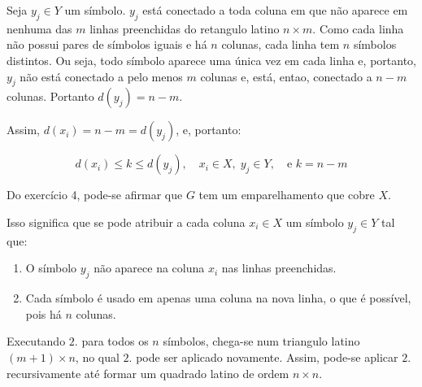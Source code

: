\documentclass{article}
\begin{document}
Seja $y_j \in Y$ um símbolo. $y_j$ está conectado a toda coluna em que não aparece em nenhuma das $m$ linhas preenchidas do retangulo latino $n \times m$. Como cada linha não possui pares de símbolos iguais e há  $n$ colunas, cada linha tem $n$ símbolos distintos. Ou seja, todo símbolo aparece uma única vez em cada linha e, portanto, $y_j$ não está conectado a pelo menos  $m$ colunas e, está, entao, conectado a $n - m$ colunas. Portanto $d(y_j) = n - m$.

Assim, $d(x_i) = n - m = d(y_j)$, e, portanto:


$$
d(x_i) \leq k \leq d(y_j), \quad x_i \in X, \; y_j \in Y, \quad \text{e } k = n - m
$$

Do exercício 4, pode-se afirmar que $G$ tem um emparelhamento que cobre $X$.

Isso significa que se pode atribuir a cada coluna $x_i \in X$  um símbolo $y_j \in Y$ tal que:

\begin{enumerate}
	\item O símbolo $y_j$ não aparece na coluna $x_i$ nas linhas preenchidas.
	\item Cada símbolo é usado em apenas uma coluna na nova linha, o que é possível, pois há $n$ colunas.
\end{enumerate}

Executando $2.$ para todos os $n$ símbolos, chega-se num triangulo latino $(m+1) \times n$, no qual $2.$ pode ser aplicado novamente. Assim, pode-se aplicar $2.$ recursivamente até formar um quadrado latino de ordem $n \times n$.
\end{document}
